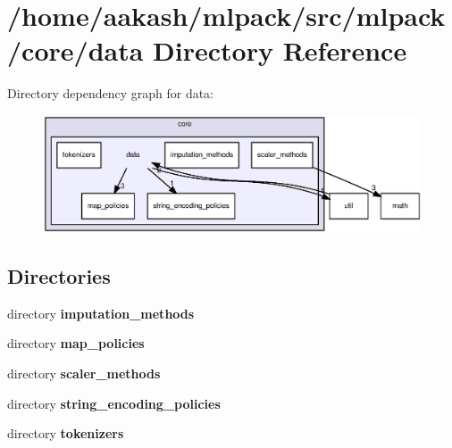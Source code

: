 \section{/home/aakash/mlpack/src/mlpack/core/data Directory Reference}
\label{dir_96b57488436375c38fa22c0899d60308}
Directory dependency graph for data\+:
\nopagebreak
\begin{figure}[H]
\begin{center}
\leavevmode
\includegraphics[width=350pt]{dir_96b57488436375c38fa22c0899d60308_dep}
\end{center}
\end{figure}
\subsection*{Directories}
\begin{DoxyCompactItemize}
\item 
directory \textbf{ imputation\+\_\+methods}
\item 
directory \textbf{ map\+\_\+policies}
\item 
directory \textbf{ scaler\+\_\+methods}
\item 
directory \textbf{ string\+\_\+encoding\+\_\+policies}
\item 
directory \textbf{ tokenizers}
\end{DoxyCompactItemize}
